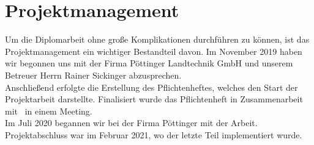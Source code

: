 \chapter{Projektmanagement}
Um die Diplomarbeit ohne große Komplikationen durchführen zu können, ist das Projektmanagement ein wichtiger Bestandteil davon. Im November 2019 haben wir begonnen uns mit der Firma Pöttinger Landtechnik GmbH und unserem Betreuer Herrn Rainer Sickinger abzusprechen.\\
Anschließend erfolgte die Erstellung des Pflichtenheftes, welches den Start der Projektarbeit darstellte. Finalisiert wurde das Pflichtenheft in Zusammenarbeit mit \ThPartnerPersonName \ in einem Meeting.\\
Im Juli 2020 begannen wir bei der Firma Pöttinger mit der Arbeit. Projektabschluss war im Februar 2021, wo der letzte Teil implementiert wurde.

